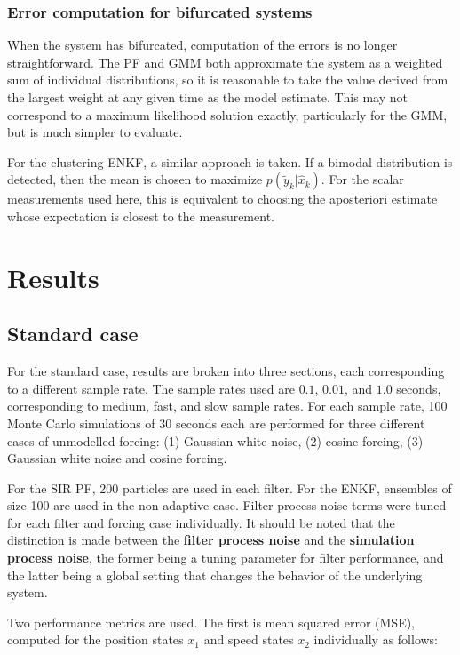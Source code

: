 \documentclass[]{article}
\begin{document}
\subsubsection{Error computation for bifurcated systems}

When the system has bifurcated, computation of the errors is no longer straightforward. The PF and GMM both approximate the system as a weighted sum of individual distributions, so it is reasonable to take the value derived from the largest weight at any given time as the model estimate. This may not correspond to a maximum likelihood solution exactly, particularly for the GMM, but is much simpler to evaluate.

For the clustering ENKF, a similar approach is taken. If a bimodal distribution is detected, then the mean is chosen to maximize $p(\tilde{y}_k | \hat{x}_k)$. For the scalar measurements used here, this is equivalent to choosing the aposteriori estimate whose expectation is closest to the measurement.

\section{Results}

\subsection{Standard case}

For the standard case, results are broken into three sections, each corresponding to a different sample rate. The sample rates used are $0.1$, $0.01$, and $1.0$ seconds, corresponding to medium, fast, and slow sample rates. For each sample rate, 100 Monte Carlo simulations of 30 seconds each are performed for three different cases of unmodelled forcing: (1) Gaussian white noise, (2) cosine forcing, (3) Gaussian white noise and cosine forcing.

For the SIR PF, 200 particles are used in each filter. For the ENKF, ensembles of size 100 are used in the non-adaptive case. Filter process noise terms were tuned for each filter and forcing case individually. It should be noted that the distinction is made between the \textbf{filter process noise} and the \textbf{simulation process noise}, the former being a tuning parameter for filter performance, and the latter being a global setting that changes the behavior of the underlying system.

Two performance metrics are used. The first is mean squared error (MSE), computed for the position states $x_1$ and speed states $x_2$ individually as follows:
\end{document}
